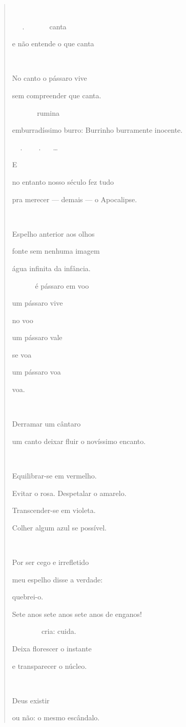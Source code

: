 \begin{quote}


.   canta

e não entende o que canta



No canto o pássaro vive

sem compreender que canta.

  rumina

emburradíssimo burro: Burrinho burramente inocente.

. . \ldots{}

E

no entanto nosso século fez tudo

pra merecer --- demais --- o Apocalipse.



Espelho anterior aos olhos

fonte sem nenhuma imagem

água infinita da infância.

  é pássaro em voo

um pássaro vive

no voo

um pássaro vale

se voa

um pássaro voa

voa.

 

Derramar um cântaro

um canto deixar fluir o novíssimo encanto.



Equilibrar-se em vermelho.

Evitar o rosa. Despetalar o amarelo.

Transcender-se em violeta.

Colher algum azul se possível.



Por ser cego e irrefletido

meu espelho disse a verdade:

quebrei-o.

Sete anos sete anos sete anos de enganos!

   cria: cuida.

Deixa florescer o instante

e transparecer o núcleo.

 

Deus existir

ou não: o mesmo escândalo.


\end{quote}

